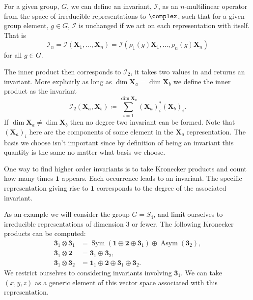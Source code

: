 \documentclass[fleqn]{NotesClass}
\newcommand*{\directsum}{\oplus}
\newcommand*{\directproduct}{\otimes}
\newcommand*{\rep}[1]{\mathbf{#1}}
\begin{document}
    For a given group, \(G\), we can define an invariant, \(\mathcal{I}\), as an \(n\)-multilinear operator from the space of irreducible representations to \(\complex\), such that for a given group element, \(g \in G\), \(\mathcal{I}\) is unchanged if we act on each representation with itself.
    That is
    \begin{equation}
        \mathcal{I}_n = \mathcal{I}(\rep{X}_1, \dotsc, \rep{X}_n) = \mathcal{I}(\rho_1(g)\rep{X}_1, \dotsc, \rho_n(g)\rep{X}_n)
    \end{equation}
    for all \(g \in G\).
    
    The inner product then corresponds to \(\mathcal{I}_2\), it takes two values in and returns an invariant.
    More explicitly as long as \(\dim \rep{X}_a = \dim \rep{X}_b\) we define the inner product as the invariant
    \begin{equation}
        \mathcal{I}_2(\rep{X}_a, \rep{X}_b) \coloneqq \sum_{i = 1}^{\dim \rep{X}_a} (\rep{X}_a)^*_i(\rep{X}_b)_i.
    \end{equation}
    If \(\dim\rep{X}_a \ne \dim\rep{X}_b\) then no degree two invariant can be formed.
    Note that \((\rep{X}_a)_i\) here are the components of some element in the \(\rep{X}_a\) representation.
    The basis we choose isn't important since by definition of being an invariant this quantity is the same no matter what basis we choose.
    
    One way to find higher order invariants is to take Kronecker products and count how many times \(\rep{1}\) appears.
    Each occurrence leads to an invariant.
    The specific representation giving rise to \(\rep{1}\) corresponds to the degree of the associated invariant.
    
    As an example we will consider the group \(G = S_4\), and limit ourselves to irreducible representations of dimension 3 or fewer.
    The following Kronecker products can be computed:
    \begin{align}
        \rep{3}_1 \directproduct \rep{3}_1 &= \mathop{\mathrm{Sym}}(\rep{1} \directsum \rep{2} \directsum \rep{3}_1) \directsum \mathop{\mathrm{Asym}}(\rep{3}_2),\\
        \rep{3}_1 \directproduct \rep{2} &= \rep{3}_1 \directsum \rep{3}_2,\\
        \rep{3}_1 \directproduct \rep{3}_2 &= \rep{1}_1 \directsum \rep{2} \directsum \rep{3}_1 \directsum \rep{3}_2.
    \end{align}
    We restrict ourselves to considering invariants involving \(\rep{3}_1\).
    We can take \((x, y, z)\) as a generic element of this vector space associated with this representation.
    
\end{document}
